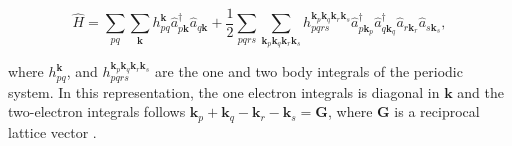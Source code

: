 \begin{equation}
\label{eq:molecularhamiltonianladder_periodic}
\hat{H} =\sum_{p q} \sum_{\boldsymbol{k}} h_{p q}^{\boldsymbol{k}} \hat{a}_{p\boldsymbol{k}}^{\dagger} \hat{a}_{q\boldsymbol{k}}+\frac{1}{2} \sum_{p q r s} \sum_{\boldsymbol{k}_p\boldsymbol{k}_q\boldsymbol{k}_r\boldsymbol{k}_s} h_{p q r s}^{\boldsymbol{k}_p\boldsymbol{k}_q\boldsymbol{k}_r\boldsymbol{k}_s} \hat{a}_{p\boldsymbol{k}_p}^{\dagger} \hat{a}_{q\boldsymbol{k}_q}^{\dagger} \hat{a}_{r\boldsymbol{k}_r} \hat{a}_{s\boldsymbol{k}_s},
\end{equation}

where $h_{p q}^{\boldsymbol{k}}$, and $h_{p q r s}^{\boldsymbol{k}_p\boldsymbol{k}_q\boldsymbol{k}_r\boldsymbol{k}_s}$ are the one and two body integrals of the periodic system. In this representation, the one electron integrals is diagonal in $\boldsymbol{k}$ and the two-electron integrals follows $\boldsymbol{k}_p + \boldsymbol{k}_q - \boldsymbol{k}_r - \boldsymbol{k}_s = \boldsymbol{G}$, where $\boldsymbol{G}$ is a reciprocal lattice vector \cite{Manrique2020, McClain2017}.

